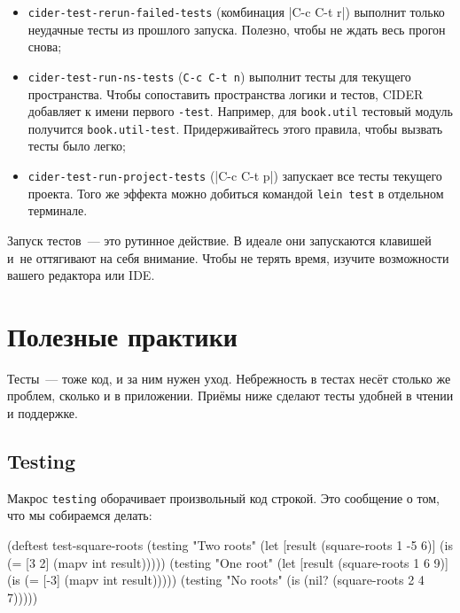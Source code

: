 \begin{itemize}

\item
  \verb|cider-test-rerun-failed-tests| (комбинация \spverb|C-c C-t r|) выполнит
  только неудачные тесты из прошлого запуска. Полезно, чтобы не ждать весь
  прогон снова;

\item
  \verb|cider-test-run-ns-tests| (\verb|C-c C-t n|) выполнит тесты для текущего
  пространства. Чтобы сопоставить пространства логики и тестов, CIDER добавляет
  к имени первого \verb|-test|. Например, для \verb|book.util| тестовый модуль
  получится \verb|book.util-test|. Придерживайтесь этого правила, чтобы вызвать
  тесты было легко;

\item
  \verb|cider-test-run-project-tests| (\spverb|C-c C-t p|) запускает все тесты
  текущего проекта. Того же эффекта можно добиться командой \verb|lein test| в
  отдельном терминале.

\end{itemize}

Запуск тестов~--- это рутинное действие. В идеале они запускаются клавишей и~не
оттягивают на себя внимание. Чтобы не терять время, изучите возможности вашего
редактора или IDE.

\section{Полезные практики}

Тесты~--- тоже код, и за ним нужен уход. Небрежность в тестах несёт столько же
проблем, сколько и в приложении. Приёмы ниже сделают тесты удобней в чтении и
поддержке.

\subsection{Testing}


Макрос \verb|testing| оборачивает произвольный код строкой. Это сообщение о том,
что мы собираемся делать:

\begin{english}
  \begin{clojure}
(deftest test-square-roots
  (testing "Two roots"
    (let [result (square-roots 1 -5 6)]
      (is (= [3 2] (mapv int result)))))
  (testing "One root"
    (let [result (square-roots 1 6 9)]
      (is (= [-3] (mapv int result)))))
  (testing "No roots"
    (is (nil? (square-roots 2 4 7)))))
  \end{clojure}
\end{english}

